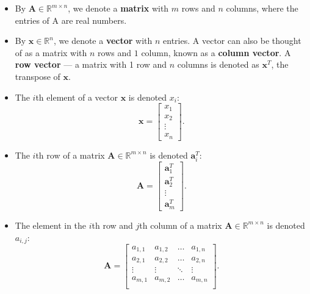 \begin{itemize}

\item By $\textbf{A} \in \mathbb{R}^{m \times n}$, we denote a {\bf matrix} with $m$ rows and $n$ columns, where the 
entries of A are real numbers.

\item By $\textbf{x} \in \mathbb{R}^{n}$, we denote a {\bf vector} with $n$ entries. A vector can also be thought of as a matrix with $n$ rows and $1$ column, known as a {\bf column vector}. A {\bf row vector} --- a matrix with 1 row and $n$ columns is denoted as $\textbf{x}^{T}$, the transpose of $\textbf{x}$.

\item The $i$th element of a vector $\textbf{x}$ is denoted $x_{i}$:
\begin{equation*}
\textbf{x} = \left[\begin{array}{c}
x_{1} \\
x_{2} \\
\vdots \\
x_{n}
\end{array}\right].
\end{equation*}

\item The $i$th row of a matrix $\textbf{A} \in \mathbb{R}^{m \times n}$ is denoted $\textbf{a}_i^T$:
\begin{equation*}
\textbf{A} = \left[\begin{array}{c}
\textbf{a}_1^T \\
\textbf{a}_2^T \\
\vdots \\
\textbf{a}_m^T
\end{array}\right].
\end{equation*}

\item The element in the $i$th row and $j$th column of a matrix $\textbf{A} \in \mathbb{R}^{m \times n}$ is denoted $a_{i,j}$:
\begin{equation*}
\textbf{A}= \left[ \begin{array}{cccc}
a_{1,1} & a_{1,2} & \hdots & a_{1,n} \\
a_{2,1} & a_{2,2} & \hdots & a_{2,n} \\
\vdots & \vdots & \ddots & \vdots \\
a_{m,1} & a_{m,2} & \hdots & a_{m,n} \\
\end{array} \right].
\end{equation*}

\end{itemize}

